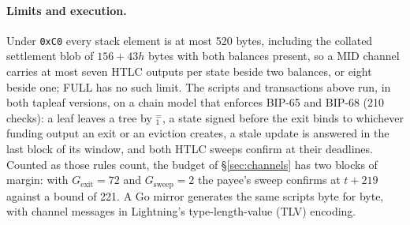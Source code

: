 \paragraph{Limits and execution.} Under \texttt{0xC0} every stack element
is at most 520 bytes, including the collated settlement blob of
$156 + 43h$ bytes with both balances present, so a MID channel carries
at most seven HTLC outputs per state beside two balances, or eight
beside one; FULL has no such limit. The scripts and transactions above
run, in both tapleaf versions, on a chain model that enforces BIP-65 and
BIP-68 (210 checks): a leaf leaves a tree by $_1^{=}$, a state
signed before the exit binds to whichever funding output an exit or an
eviction creates, a stale update is answered in the last block of its
window, and both HTLC sweeps confirm at their deadlines. Counted as
those rules count, the budget of \S\ref{sec:channels} has two blocks of
margin: with $G_{\mathrm{exit}} = 72$ and $G_{\mathrm{sweep}} = 2$ the
payee's sweep confirms at $t + 219$ against a bound of 221. A Go mirror
generates the same scripts byte for byte, with channel messages in
Lightning's type-length-value (TLV) encoding.

